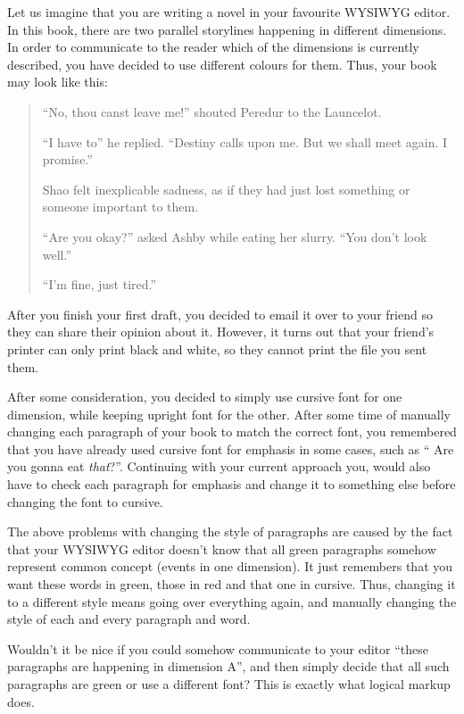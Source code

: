 Let us imagine that you are writing a novel in your favourite WYSIWYG editor. In
this book, there are two parallel storylines happening in different dimensions.
In order to communicate to the reader which of the dimensions is currently
described, you have decided to use different colours for them. Thus, your book
may look like this:
\begin{quotation}
  {\color[HTML]{B71C1C}

    \enquote{No, thou canst leave me!} shouted Peredur to the Launcelot.

    \enquote{I have to} he replied. \enquote{Destiny calls upon me. But we shall
      meet again. I promise.} }

  {\color[HTML]{2E7D32}

    Shao felt inexplicable sadness, as if they had just lost something or
    someone important to them.

    \enquote{Are you okay?} asked Ashby while eating her slurry. \enquote{You
      don't look well.}

    \enquote{I'm fine, just tired.}
  }
\end{quotation}

After you finish your first draft, you decided to email it over to your friend
so they can share their opinion about it. However, it turns out that your
friend's printer can only print black and white, so they cannot print the file
you sent them.

After some consideration, you decided to simply use cursive font for one
dimension, while keeping upright font for the other. After some time of manually
changing each paragraph of your book to match the correct font, you remembered
that you have already used cursive font for emphasis in some cases, such as
\enquote{{\color[HTML]{2E7D32} Are you gonna eat \emph{that}?}}. Continuing
with your current approach you, would also have to check each paragraph for
emphasis and change it to something else before changing the font to cursive.

The above problems with changing the style of paragraphs are caused by the fact
that your WYSIWYG editor doesn't know that all green paragraphs somehow
represent common concept (events in one dimension). It just remembers that you
want these words in green, those in red and that one in cursive. Thus, changing
it to a different style means going over everything again, and manually changing
the style of each and every paragraph and word.

Wouldn't it be nice if you could somehow communicate to your editor
\enquote{these paragraphs are happening in dimension A}, and then simply decide
that all such paragraphs are green or use a different font? This is exactly
what logical markup does.


